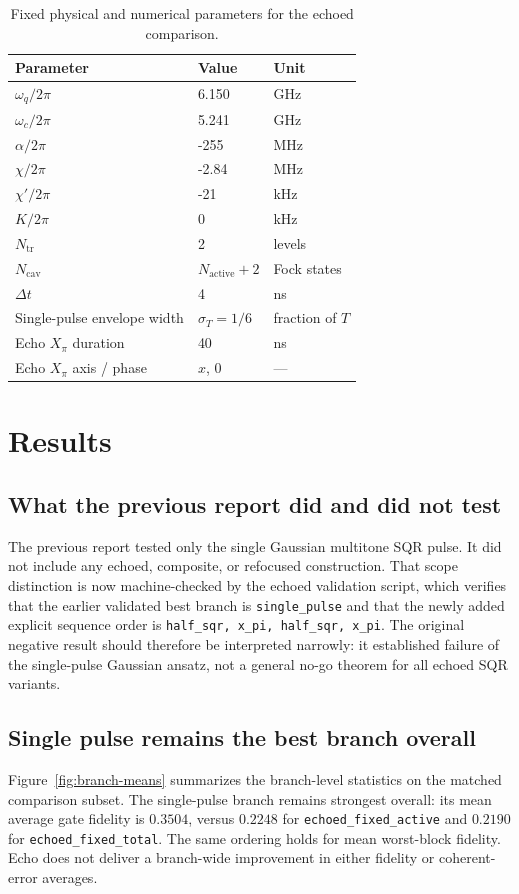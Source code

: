 \documentclass[aps,pra,twocolumn,reprint,floatfix,amsmath,amssymb]{revtex4-2}
\begin{document}
\begin{table}[t]
  \centering
  \caption{Fixed physical and numerical parameters for the echoed comparison.}
  \begin{tabular}{@{}lll@{}}
    \toprule
    Parameter & Value & Unit \\
    \midrule
$\omega_q/2\pi$ & 6.150 & GHz \\
    $\omega_c/2\pi$ & 5.241 & GHz \\
    $\alpha/2\pi$ & -255 & MHz \\
    $\chi/2\pi$ & -2.84 & MHz \\
    $\chi'/2\pi$ & -21 & kHz \\
    $K/2\pi$ & 0 & kHz \\
    $N_{\mathrm{tr}}$ & 2 & levels \\
    $N_{\mathrm{cav}}$ & $N_{\mathrm{active}}+2$ & Fock states \\
    $\Delta t$ & 4 & ns \\
    Single-pulse envelope width & $\sigma_T=1/6$ & fraction of $T$ \\
    Echo \(X_\pi\) duration & 40 & ns \\
    Echo \(X_\pi\) axis / phase & $x$, $0$ & --- \\
    \bottomrule
  \end{tabular}
  \label{tab:params}
\end{table}

\section{Results}

\subsection{What the previous report did and did not test}
The previous report tested only the single Gaussian multitone SQR pulse. It did not include any echoed, composite, or refocused construction. That scope distinction is now machine-checked by the echoed validation script, which verifies that the earlier validated best branch is \texttt{single\_pulse} and that the newly added explicit sequence order is \texttt{half\_sqr, x\_pi, half\_sqr, x\_pi}. The original negative result should therefore be interpreted narrowly: it established failure of the single-pulse Gaussian ansatz, not a general no-go theorem for all echoed SQR variants.

\subsection{Single pulse remains the best branch overall}
Figure~\ref{fig:branch-means} summarizes the branch-level statistics on the matched comparison subset. The single-pulse branch remains strongest overall: its mean average gate fidelity is \(0.3504\), versus \(0.2248\) for \texttt{echoed\_fixed\_active} and \(0.2190\) for \texttt{echoed\_fixed\_total}. The same ordering holds for mean worst-block fidelity. Echo does not deliver a branch-wide improvement in either fidelity or coherent-error averages.
\end{document}
